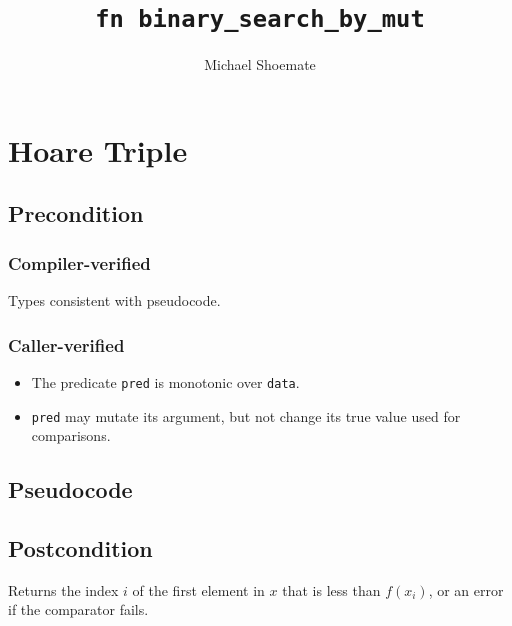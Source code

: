 \documentclass{article}
\title{\texttt{fn binary\_search\_by\_mut}}
\author{Michael Shoemate}
\begin{document}
  
\maketitle 
 
\section{Hoare Triple} 
\subsection*{Precondition} 
\subsubsection*{Compiler-verified}
Types consistent with pseudocode.

\subsubsection*{Caller-verified}
\begin{itemize}
    \item The predicate \texttt{pred} is monotonic over \texttt{data}.
    \item \texttt{pred} may mutate its argument, but not change its true value used for comparisons.
\end{itemize}

\subsection*{Pseudocode} 
\label{sec:python-pseudocode} 
 
 
\subsection*{Postcondition} 

\begin{theorem}
    Returns the index $i$ of the first element in $x$ that is less than $f(x_i)$,
    or an error if the comparator fails.
\end{theorem}
\end{document}
